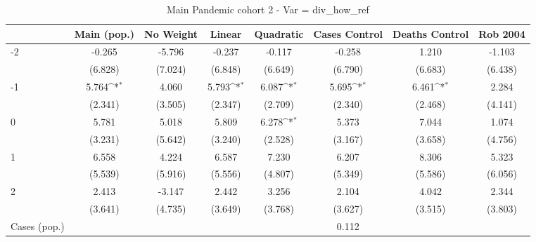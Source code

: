 \documentclass{article}
\begin{document}
{
\def\sym#1{\ifmmode^{#1}\else\(^{#1}\)\fi}
\begin{longtable}{l*{7}{c}}
\caption{Main Pandemic cohort 2 - Var = div\_how\_ref}\\
\hline\hline\endfirsthead\hline\endhead\hline\endfoot\endlastfoot
                &\multicolumn{1}{c}{Main (pop.)}&\multicolumn{1}{c}{No Weight}&\multicolumn{1}{c}{Linear}&\multicolumn{1}{c}{Quadratic}&\multicolumn{1}{c}{Cases Control}&\multicolumn{1}{c}{Deaths Control}&\multicolumn{1}{c}{Rob 2004}\\
\hline
-2              &   -0.265         &   -5.796         &   -0.237         &   -0.117         &   -0.258         &    1.210         &   -1.103         \\
                &  (6.828)         &  (7.024)         &  (6.848)         &  (6.649)         &  (6.790)         &  (6.683)         &  (6.438)         \\
-1              &    5.764\sym{*}  &    4.060         &    5.793\sym{*}  &    6.087\sym{*}  &    5.695\sym{*}  &    6.461\sym{*}  &    2.284         \\
                &  (2.341)         &  (3.505)         &  (2.347)         &  (2.709)         &  (2.340)         &  (2.468)         &  (4.141)         \\
0               &    5.781         &    5.018         &    5.809         &    6.278\sym{*}  &    5.373         &    7.044         &    1.074         \\
                &  (3.231)         &  (5.642)         &  (3.240)         &  (2.528)         &  (3.167)         &  (3.658)         &  (4.756)         \\
1               &    6.558         &    4.224         &    6.587         &    7.230         &    6.207         &    8.306         &    5.323         \\
                &  (5.539)         &  (5.916)         &  (5.556)         &  (4.807)         &  (5.349)         &  (5.586)         &  (6.056)         \\
2               &    2.413         &   -3.147         &    2.442         &    3.256         &    2.104         &    4.042         &    2.344         \\
                &  (3.641)         &  (4.735)         &  (3.649)         &  (3.768)         &  (3.627)         &  (3.515)         &  (3.803)         \\
Cases (pop.)    &                  &                  &                  &                  &    0.112         &                  &                  \\

\end{longtable}}
\end{document}
